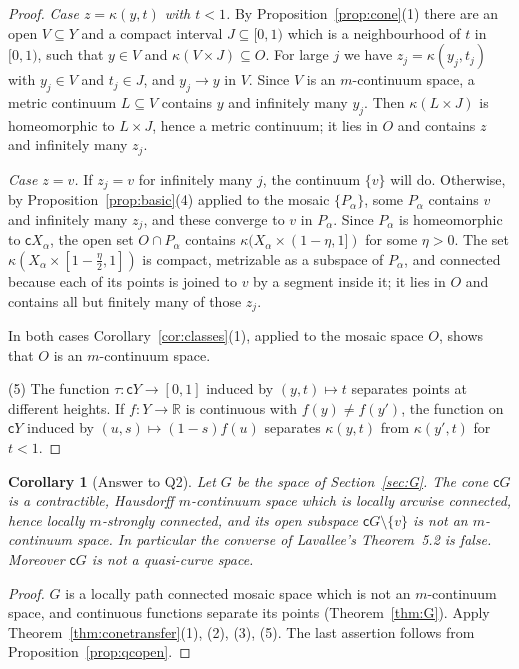 \documentclass[11pt]{amsart}
\newtheorem{corollary}[theorem]{Corollary}
\theoremstyle{definition}
\theoremstyle{remark}
\newcommand{\R}{\mathbb{R}}
\newcommand{\cone}{\mathsf{c}}
\numberwithin{equation}{section}
\begin{document}
\begin{proof}
\emph{Case $z=\kappa(y,t)$ with $t<1$.} By Proposition~\ref{prop:cone}(1) there are an open $V\subseteq Y$ and a compact interval $J\subseteq[0,1)$ which is a neighbourhood of $t$ in $[0,1)$, such that $y\in V$ and $\kappa(V\times J)\subseteq O$. For large $j$ we have $z_j=\kappa(y_j,t_j)$ with $y_j\in V$ and $t_j\in J$, and $y_j\to y$ in $V$. Since $V$ is an $m$-continuum space, a metric continuum $L\subseteq V$ contains $y$ and infinitely many $y_j$. Then $\kappa(L\times J)$ is homeomorphic to $L\times J$, hence a metric continuum; it lies in $O$ and contains $z$ and infinitely many $z_j$.

\emph{Case $z=v$.} If $z_j=v$ for infinitely many $j$, the continuum $\{v\}$ will do. Otherwise, by Proposition~\ref{prop:basic}(4) applied to the mosaic $\{P_\alpha\}$, some $P_\alpha$ contains $v$ and infinitely many $z_j$, and these converge to $v$ in $P_\alpha$. Since $P_\alpha$ is homeomorphic to $\cone X_\alpha$, the open set $O\cap P_\alpha$ contains $\kappa(X_\alpha\times(1-\eta,1])$ for some $\eta>0$. The set $\kappa(X_\alpha\times[1-\frac\eta2,1])$ is compact, metrizable as a subspace of $P_\alpha$, and connected because each of its points is joined to $v$ by a segment inside it; it lies in $O$ and contains all but finitely many of those $z_j$.

In both cases Corollary~\ref{cor:classes}(1), applied to the mosaic space $O$, shows that $O$ is an $m$-continuum space.

(5) The function $\tau\colon\cone Y\to[0,1]$ induced by $(y,t)\mapsto t$ separates points at different heights. If $f\colon Y\to\R$ is continuous with $f(y)\ne f(y')$, the function on $\cone Y$ induced by $(u,s)\mapsto(1-s)f(u)$ separates $\kappa(y,t)$ from $\kappa(y',t)$ for $t<1$.
\end{proof}

\begin{corollary}[Answer to Q2]\label{cor:Q2}
Let $G$ be the space of Section~\ref{sec:G}. The cone $\cone G$ is a contractible, Hausdorff $m$-continuum space which is locally arcwise connected, hence locally $m$-strongly connected, and its open subspace $\cone G\setminus\{v\}$ is not an $m$-continuum space. In particular the converse of Lavallee's Theorem~5.2 is false. Moreover $\cone G$ is not a quasi-curve space.
\end{corollary}
\begin{proof}
$G$ is a locally path connected mosaic space which is not an $m$-continuum space, and continuous functions separate its points (Theorem~\ref{thm:G}). Apply Theorem~\ref{thm:conetransfer}(1), (2), (3), (5). The last assertion follows from Proposition~\ref{prop:qcopen}.
\end{proof}
\end{document}
